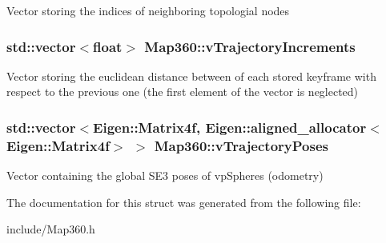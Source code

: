 Vector storing the indices of neighboring topologial nodes \hypertarget{structMap360_a8e2c7d8e67a89301b1b0b36a5380671f}{
\subsubsection[{v\-Trajectory\-Increments}]{\setlength{\rightskip}{0pt plus 5cm}std\-::vector$<$float$>$ Map360\-::v\-Trajectory\-Increments}}\label{structMap360_a8e2c7d8e67a89301b1b0b36a5380671f}
Vector storing the euclidean distance between of each stored keyframe with respect to the previous one (the first element of the vector is neglected) \hypertarget{structMap360_a6a2b5cd71a12419ce5367208bca515ce}{
\subsubsection[{v\-Trajectory\-Poses}]{\setlength{\rightskip}{0pt plus 5cm}std\-::vector$<$Eigen\-::\-Matrix4f, Eigen\-::aligned\-\_\-allocator$<$Eigen\-::\-Matrix4f$>$ $>$ Map360\-::v\-Trajectory\-Poses}}\label{structMap360_a6a2b5cd71a12419ce5367208bca515ce}
Vector containing the global S\-E3 poses of vp\-Spheres (odometry) 

The documentation for this struct was generated from the following file\-:\begin{DoxyCompactItemize}
\item 
include/Map360.\-h\end{DoxyCompactItemize}
